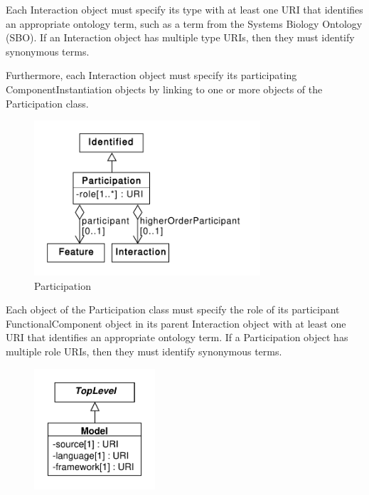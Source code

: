 \documentclass[draftspec]{sbmlpkgspec}
\begin{document}
Each Interaction object must specify its type with at least one URI that identifies an appropriate ontology term, such as a term from the Systems Biology Ontology (SBO). If an Interaction object has multiple type URIs, then they must identify synonymous terms. 

Furthermore, each Interaction object must specify its participating ComponentInstantiation objects by linking to one or more objects of the Participation class.

\begin{figure}[h]
\begin{center}
\includegraphics[width=0.75\textwidth]{uml/participation}
\caption[]{Participation}
\label{uml:participation}
\end{center}
\end{figure}

Each object of the Participation class must specify the role of its participant FunctionalComponent object in its parent Interaction object with at least one URI that identifies an appropriate ontology term. If a Participation object has multiple role URIs, then they must identify synonymous terms. 

\begin{figure}[h]
\begin{center}
\includegraphics[width=0.4\textwidth]{uml/model}
\caption[]{}
\label{uml:model}
\end{center}
\end{figure}
\end{document}
